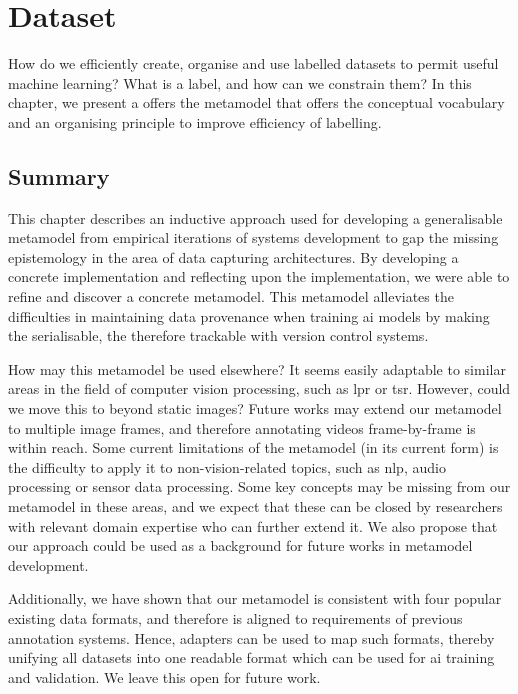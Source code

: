 \chapter{Dataset}
\label{ch:dataset}

How do we efficiently create, organise and use labelled datasets to permit useful machine learning? What is a label, and how can we constrain them? In this chapter, we present a offers the metamodel that offers the conceptual vocabulary and an organising principle to improve efficiency of labelling.






\newpage
\section{Summary}

This chapter describes an inductive approach used for developing a generalisable metamodel from empirical iterations of systems development to gap the missing epistemology in the area of data capturing architectures. By developing a concrete implementation and reflecting upon the implementation, we were able to refine and discover a concrete metamodel. This metamodel alleviates the difficulties in maintaining data provenance when training \gls{ai} models by making the serialisable, the therefore trackable with version control systems.

How may this metamodel be used elsewhere? It seems easily adaptable to similar areas in the field of computer vision processing, such as \gls{lpr} or \gls{tsr}. However, could we move this to beyond static images? Future works may extend our metamodel to multiple image frames, and therefore annotating videos frame-by-frame is within reach. Some current limitations of the metamodel (in its current form) is the difficulty to apply it to non-vision-related topics, such as \gls{nlp}, audio processing or sensor data processing. Some key concepts may be missing from our metamodel in these areas, and we expect that these can be closed by researchers with relevant domain expertise who can further extend it. We also propose that our approach could be used as a background for future works in metamodel development.

Additionally, we have shown that our metamodel is consistent with four popular existing data formats, and therefore is aligned to requirements of previous annotation systems. Hence, adapters can be used to map such formats, thereby unifying all datasets into one readable format which can be used for \gls{ai} training and validation. We leave this open for future work.

